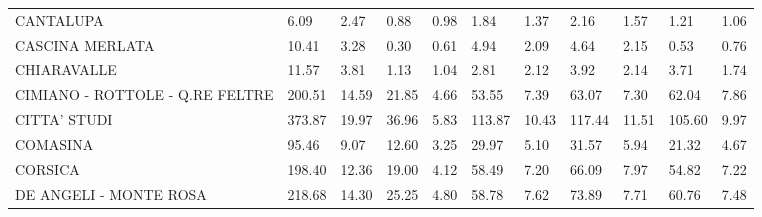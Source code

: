 \begin{table}[H]
{{\begin{tabular}{lp{1.3cm}p{1.3cm}p{1.3cm}p{1.3cm}p{1.3cm}p{1.3cm}p{1.3cm}p{1.3cm}p{1.3cm}p{1.3cm}}
CANTALUPA                                          &                      6.09 &                  2.47 &                        0.88 &                    0.98 &                        1.84 &                    1.37 &                        2.16 &                    1.57 &                      1.21 &                  1.06 \\
CASCINA MERLATA                                    &                     10.41 &                  3.28 &                        0.30 &                    0.61 &                        4.94 &                    2.09 &                        4.64 &                    2.15 &                      0.53 &                  0.76 \\
CHIARAVALLE                                        &                     11.57 &                  3.81 &                        1.13 &                    1.04 &                        2.81 &                    2.12 &                        3.92 &                    2.14 &                      3.71 &                  1.74 \\
CIMIANO - ROTTOLE - Q.RE FELTRE                    &                    200.51 &                 14.59 &                       21.85 &                    4.66 &                       53.55 &                    7.39 &                       63.07 &                    7.30 &                     62.04 &                  7.86 \\
CITTA' STUDI                                       &                    373.87 &                 19.97 &                       36.96 &                    5.83 &                      113.87 &                   10.43 &                      117.44 &                   11.51 &                    105.60 &                  9.97 \\
COMASINA                                           &                     95.46 &                  9.07 &                       12.60 &                    3.25 &                       29.97 &                    5.10 &                       31.57 &                    5.94 &                     21.32 &                  4.67 \\
CORSICA                                            &                    198.40 &                 12.36 &                       19.00 &                    4.12 &                       58.49 &                    7.20 &                       66.09 &                    7.97 &                     54.82 &                  7.22 \\
DE ANGELI - MONTE ROSA                             &                    218.68 &                 14.30 &                       25.25 &                    4.80 &                       58.78 &                    7.62 &                       73.89 &                    7.71 &                     60.76 &                  7.48 \\

\end{tabular}}}
\end{table}
